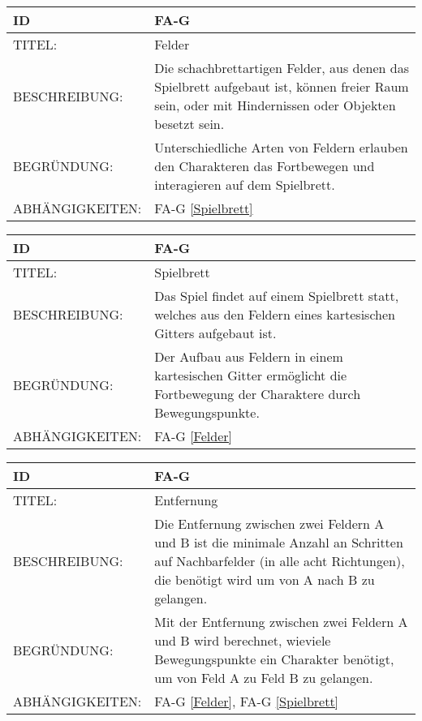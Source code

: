 
\begin{tabularx}{16cm}{l|X}
	{table}\label{Felder}
	\textbf{ID} & \textbf{FA-G \arabic{table}} \\
	\hline
	TITEL: & Felder \\
	\hline
	BESCHREIBUNG: & Die schachbrettartigen Felder, aus denen das Spielbrett aufgebaut ist, können freier Raum sein, oder mit Hindernissen oder Objekten besetzt sein. \\
	\hline
	BEGRÜNDUNG: & Unterschiedliche Arten von Feldern erlauben den Charakteren das Fortbewegen und interagieren auf dem Spielbrett. \\
	\hline
	ABHÄNGIGKEITEN: & FA-G \ref{Spielbrett} \\
\end{tabularx}

\begin{tabularx}{16cm}{l|X}
	{table}\label{Spielbrett}
	\textbf{ID} & \textbf{FA-G \arabic{table}} \\
	\hline
	TITEL: & Spielbrett \\
	\hline
	BESCHREIBUNG: & Das Spiel findet auf einem Spielbrett statt, welches aus den Feldern eines kartesischen Gitters aufgebaut ist. \\
	\hline
	BEGRÜNDUNG: & Der Aufbau aus Feldern in einem kartesischen Gitter ermöglicht die Fortbewegung der Charaktere durch Bewegungspunkte. \\
	\hline
	ABHÄNGIGKEITEN: & FA-G \ref{Felder} \\
\end{tabularx}

\begin{tabularx}{16cm}{l|X}
	{table}\label{Entfernung}
	\textbf{ID} & \textbf{FA-G \arabic{table}} \\
	\hline
	TITEL: & Entfernung \\
	\hline
	BESCHREIBUNG: & Die Entfernung zwischen zwei Feldern A und B ist die minimale Anzahl an Schritten auf Nachbarfelder (in alle acht Richtungen), die benötigt wird um von A nach B zu gelangen. \\
	\hline
	BEGRÜNDUNG: & Mit der Entfernung zwischen zwei Feldern A und B wird berechnet, wieviele Bewegungspunkte ein Charakter benötigt, um von Feld A zu Feld B zu gelangen. \\
	\hline
	ABHÄNGIGKEITEN: & FA-G \ref{Felder}, FA-G \ref{Spielbrett} \\
\end{tabularx}

